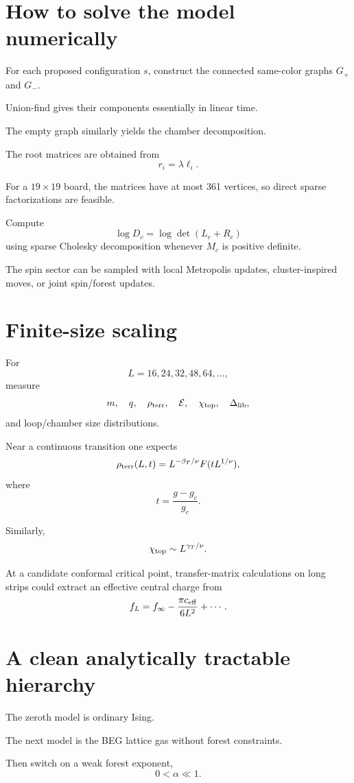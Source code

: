 \documentclass[11pt]{article}
\begin{document}
\section{How to solve the model numerically}

For each proposed configuration \(s\), construct the connected same-color graphs \(G_+\) and \(G_-\).

Union-find gives their components essentially in linear time.

The empty graph similarly yields the chamber decomposition.

The root matrices are obtained from
\[
r_i=\lambda\ell_i.
\]

For a \(19\times19\) board, the matrices have at most 361 vertices, so direct sparse factorizations are feasible.

Compute
\[
\log D_c
=
\log\det(L_c+R_c)
\]
using sparse Cholesky decomposition whenever \(M_c\) is positive definite.

The spin sector can be sampled with local Metropolis updates, cluster-inspired moves, or joint spin/forest updates.

\section{Finite-size scaling}

For
\[
L=16,24,32,48,64,\ldots,
\]
measure
\[
m,\quad
q,\quad
\rho_{\rm terr},\quad
\mathcal E,\quad
\chi_{\rm top},\quad
\Delta_{\rm lib},
\]
and loop/chamber size distributions.

Near a continuous transition one expects
\[
\rho_{\rm terr}(L,t)
=
L^{-\beta_T/\nu}
F(tL^{1/\nu}),
\]
where
\[
t=\frac{g-g_c}{g_c}.
\]

Similarly,
\[
\chi_{\rm top}
\sim
L^{\gamma_T/\nu}.
\]

At a candidate conformal critical point, transfer-matrix calculations on long strips could extract an effective central charge from
\[
f_L
=
f_\infty
-\frac{\pi c_{\rm eff}}{6L^2}
+\cdots.
\]

\section{A clean analytically tractable hierarchy}

The zeroth model is ordinary Ising.

The next model is the BEG lattice gas without forest constraints.

Then switch on a weak forest exponent,
\[
0<\alpha\ll1.
\]
\end{document}
